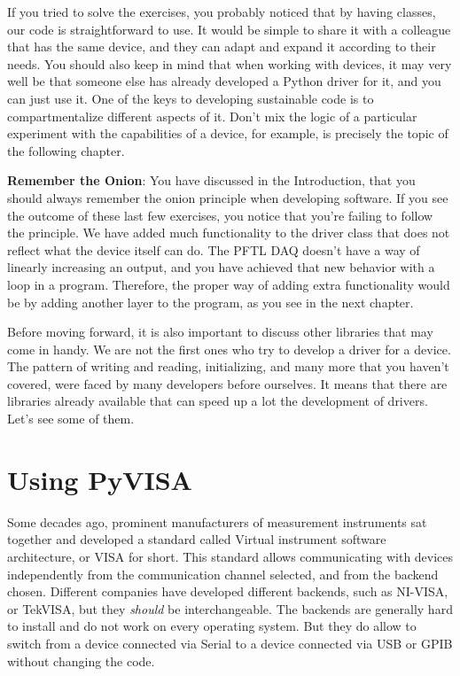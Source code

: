

If you tried to solve the exercises, you probably noticed that by having classes, our code is straightforward to use. It would be simple to share it with a colleague that has the same device, and they can adapt and expand it according to their needs. You should also keep in mind that when working with devices, it may very well be that someone else has already developed a Python driver for it, and you can just use it. One of the keys to developing sustainable code is to compartmentalize different aspects of it. Don't mix the logic of a particular experiment with the capabilities of a device, for example, is precisely the topic of the following chapter.

\textbf{Remember the Onion}: You have discussed in the Introduction, that you should always remember the onion principle when developing software. If you see the outcome of these last few exercises, you notice that you're failing to follow the principle. We have added much functionality to the driver class that does not reflect what the device itself can do. The {PFTL DAQ} doesn't have a way of linearly increasing an output, and you have achieved that new behavior with a loop in a program. Therefore, the proper way of adding extra functionality would be by adding another layer to the program, as you see in the next chapter.

Before moving forward, it is also important to discuss other libraries that may come in handy. We are not the first ones who try to develop a driver for a device. The pattern of writing and reading, initializing, and many more that you haven't covered, were faced by many developers before ourselves. It means that there are libraries already available that can speed up a lot the development of drivers. Let's see some of them.

\section{Using PyVISA}\label{sec:pyvisa}
Some decades ago, prominent manufacturers of measurement instruments sat together and developed a standard called Virtual instrument software architecture, or VISA for short. This standard allows communicating with devices independently from the communication channel selected, and from the backend chosen. Different companies have developed different backends, such as NI-VISA, or TekVISA, but they \emph{should} be interchangeable. The backends are generally hard to install and do not work on every operating system. But they do allow to switch from a device connected via Serial to a device connected via USB or GPIB without changing the code.

